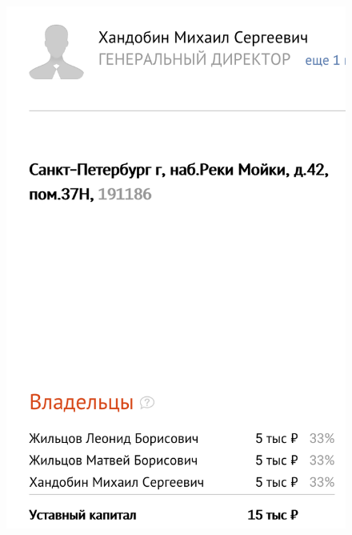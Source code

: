 \begin{figure}[ht]
	\centering
	\label{by_inn}
	\includegraphics[width=\textwidth]{images/by_inn.png}
	\caption{}
\end{figure}
